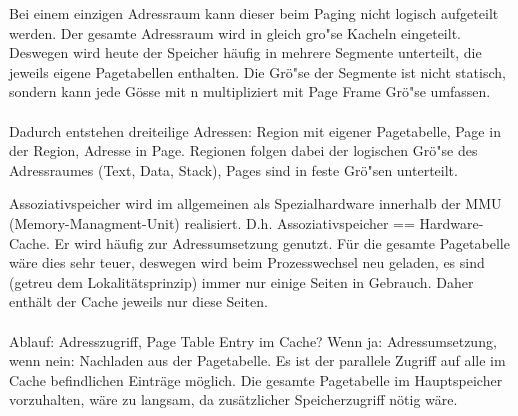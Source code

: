 \begin{answer}
  Bei einem einzigen Adressraum kann dieser beim Paging nicht logisch aufgeteilt werden. Der gesamte Adressraum wird in gleich gro"se Kacheln eingeteilt.
  Deswegen wird heute der Speicher häufig in mehrere Segmente unterteilt, die jeweils eigene Pagetabellen enthalten. Die Grö"se der Segmente ist nicht statisch, sondern kann jede Gösse mit n multipliziert mit Page Frame Grö"se umfassen.

  \paragraph*{}
  Dadurch entstehen dreiteilige Adressen:
  Region mit eigener Pagetabelle, Page in der Region, Adresse in Page.
  Regionen folgen dabei der logischen Grö"se des Adressraumes (Text, Data, Stack), Pages sind in feste Grö"sen unterteilt.
\end{answer}

\begin{answer}
  Assoziativspeicher wird im allgemeinen als Spezialhardware innerhalb der MMU (Memory-Managment-Unit) realisiert. D.h. Assoziativspeicher == Hardware-Cache.
  Er wird häufig zur Adressumsetzung genutzt. Für die gesamte Pagetabelle wäre dies sehr teuer, deswegen wird beim Prozesswechsel neu geladen, es sind (getreu dem Lokalitätsprinzip) immer nur einige Seiten in Gebrauch. Daher enthält der Cache jeweils nur diese Seiten.

  \paragraph*{}
  Ablauf: Adresszugriff,
  Page Table Entry im Cache? Wenn ja: Adressumsetzung, wenn nein: Nachladen aus der Pagetabelle.
  Es ist der parallele Zugriff auf alle im Cache befindlichen Einträge möglich. Die gesamte Pagetabelle im Hauptspeicher vorzuhalten, wäre zu langsam, da zusätzlicher Speicherzugriff nötig wäre.
\end{answer}

